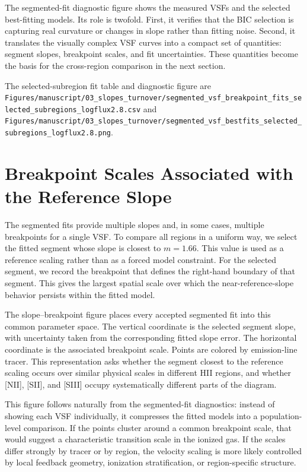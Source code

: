 The segmented-fit diagnostic figure shows the measured VSFs and the selected
best-fitting models. Its role is twofold. First, it verifies that the BIC
selection is capturing real curvature or changes in slope rather than fitting
noise. Second, it translates the visually complex VSF curves into a compact set
of quantities: segment slopes, breakpoint scales, and fit uncertainties. These
quantities become the basis for the cross-region comparison in the next
section.

The selected-subregion fit table and diagnostic figure are
\texttt{Figures/manuscript/03\_slopes\_turnover/segmented\_vsf\_breakpoint\_fits\_selected\_subregions\_logflux2.8.csv}
and
\texttt{Figures/manuscript/03\_slopes\_turnover/segmented\_vsf\_bestfits\_selected\_subregions\_logflux2.8.png}.

\section{Breakpoint Scales Associated with the Reference Slope}
\label{sec:slope-turnover}

The segmented fits provide multiple slopes and, in some cases, multiple
breakpoints for a single VSF. To compare all regions in a uniform way, we
select the fitted segment whose slope is closest to $m=1.66$. This value is
used as a reference scaling rather than as a forced model constraint. For the
selected segment, we record the breakpoint that defines the right-hand boundary
of that segment. This gives the largest spatial scale over which the
near-reference-slope behavior persists within the fitted model.

The slope--breakpoint figure places every accepted segmented fit into this
common parameter space. The vertical coordinate is the selected segment slope,
with uncertainty taken from the corresponding fitted slope error. The
horizontal coordinate is the associated breakpoint scale. Points are colored by
emission-line tracer. This representation asks whether the segment closest to
the reference scaling occurs over similar physical scales in different HII
regions, and whether [NII], [SII], and [SIII] occupy systematically different
parts of the diagram.

This figure follows naturally from the segmented-fit diagnostics: instead of
showing each VSF individually, it compresses the fitted models into a
population-level comparison. If the points cluster around a common breakpoint
scale, that would suggest a characteristic transition scale in the ionized gas.
If the scales differ strongly by tracer or by region, the velocity scaling is
more likely controlled by local feedback geometry, ionization stratification,
or region-specific structure.

